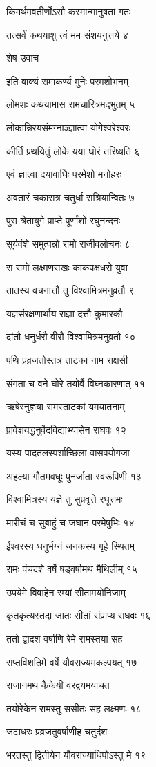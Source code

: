 किमर्थमवतीर्णोऽसौ कस्मान्मानुषतां गतः

तत्सर्वं कथयाशु त्वं मम संशयनुत्तये ४

शेष उवाच

इति वाक्यं समाकर्ण्य मुनेः परमशोभनम्

लोमशः कथयामास रामचारित्रमद्भुतम् ५

लोकान्निरयसंमग्नाञ्ज्ञात्वा योगेश्वरेश्वरः

कीर्तिं प्रथयितुं लोके यया घोरं तरिष्यति ६

एवं ज्ञात्वा दयावार्धिः परमेशो मनोहरः

अवतारं चकारात्र चतुर्धा सश्रियान्वितः ७

पुरा त्रेतायुगे प्राप्ते पूर्णांशो रघुनन्दनः

सूर्यवंशे समुत्पन्नो रामो राजीवलोचनः ८

स रामो लक्ष्मणसखः काकपक्षधरो युवा

तातस्य वचनात्तौ तु विश्वामित्रमनुव्रतौ ९

यज्ञसंरक्षणार्थाय राज्ञा दत्तौ कुमारकौ

दांतौ धनुर्धरौ वीरौ विश्वामित्रमनुव्रतौ १०

पथि प्रव्रजतोस्तत्र ताटका नाम राक्षसी

संगता च वने घोरे तयोर्वै विघ्नकारणात् ११

ऋषेरनुज्ञया रामस्ताटकां यमयातनाम्

प्रावेशयद्धनुर्वेदविद्याभ्यासेन राघवः १२

यस्य पादतलस्पर्शाच्छिला वासवयोगजा

अहल्या गौतमवधूः पुनर्जाता स्वरूपिणी १३

विश्वामित्रस्य यज्ञे तु सुप्रवृत्ते रघूत्तमः

मारीचं च सुबाहुं च जघान परमेषुभिः १४

ईश्वरस्य धनुर्भग्नं जनकस्य गृहे स्थितम्

रामः पंचदशे वर्षे षड्वर्षामथ मैथिलीम् १५

उपयेमे विवाहेन रम्यां सीतामयोनिजाम्

कृतकृत्यस्तदा जातः सीतां संप्राप्य राघवः १६

ततो द्वादश वर्षाणि रेमे रामस्तया सह

सप्तविंशतिमे वर्षे यौवराज्यमकल्पयत् १७

राजानमथ कैकेयी वरद्वयमयाचत

तयोरेकेन रामस्तु ससीतः सह लक्ष्मणः १८

जटाधरः प्रव्रजतुवर्षाणीह चतुर्दश

भरतस्तु द्वितीयेन यौवराज्याधिपोऽस्तु मे १९

